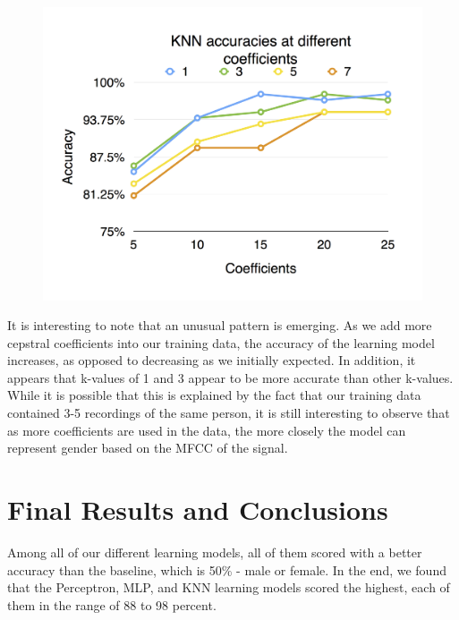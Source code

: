 \documentclass{article}
\begin{document}
\begin{figure}[h]
\includegraphics[width=\linewidth]{KNN_accuracies_with_different_coeff}
\end{figure}

It is interesting to note that an unusual pattern is emerging.  As we add more cepstral coefficients into our training data, the accuracy of the learning model increases, as opposed to decreasing as we initially expected.  In addition, it appears that k-values of 1 and 3 appear to be more accurate than other k-values.  While it is possible that this is explained by the fact that our training data contained 3-5 recordings of the same person, it is still interesting to observe that as more coefficients are used in the data, the more closely the model can represent gender based on the MFCC of the signal.

\section{Final Results and Conclusions}

Among all of our different learning models, all of them scored with a better accuracy than the baseline, which is 50\% - male or female. In the end, we found that the Perceptron, MLP, and KNN learning models scored the highest, each of them in the range of  88 to 98 percent.
\end{document}
